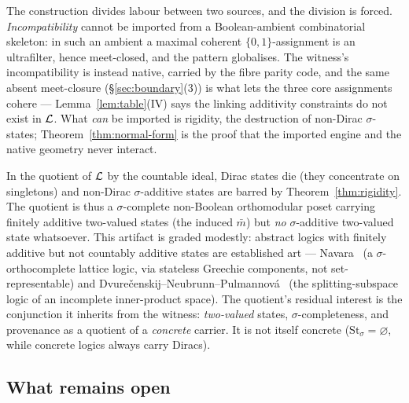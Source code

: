 \begin{remark}\label{rem:coherence-location}
The construction divides labour between two sources, and the division is forced.
\emph{Incompatibility} cannot be imported from a Boolean-ambient combinatorial
skeleton: in such an ambient a maximal coherent $\{0,1\}$-assignment is an
ultrafilter, hence meet-closed, and the pattern globalises. The witness's
incompatibility is instead native, carried by the fibre parity code, and the
same absent meet-closure (\S\ref{sec:boundary}(3)) is what lets the three core
assignments cohere --- Lemma~\ref{lem:table}(IV) says the linking additivity
constraints do not exist in $\mathcal{L}$. What \emph{can} be imported is rigidity, the
destruction of non-Dirac $\sigma$-states; Theorem~\ref{thm:normal-form} is the
proof that the imported engine and the native geometry never interact.
\end{remark}

\begin{remark}\label{rem:quotient}
In the quotient of $\mathcal{L}$ by the countable ideal, Dirac states die (they
concentrate on singletons) and non-Dirac $\sigma$-additive states are barred by
Theorem~\ref{thm:rigidity}. The quotient is thus a $\sigma$-complete non-Boolean
orthomodular poset carrying finitely additive two-valued states (the induced
$\bar m$) but \emph{no} $\sigma$-additive two-valued state whatsoever. This
artifact is graded modestly: abstract logics with finitely additive but not
countably additive states are established art ---
Navara~\cite{Navara1992} (a $\sigma$-orthocomplete lattice logic, via stateless
Greechie components, not set-representable) and
Dvure\v{c}enskij--Neubrunn--Pulmannov\'a~\cite{DvurecenskijNeubrunnPulmannova1992}
(the splitting-subspace logic of an incomplete inner-product space). The
quotient's residual interest is the conjunction it inherits from the witness:
\emph{two-valued} states, $\sigma$-completeness, and provenance as a quotient of
a \emph{concrete} carrier. It is not itself concrete
($\mathrm{St}_\sigma=\varnothing$, while concrete logics always carry Diracs).
\end{remark}

\subsection*{What remains open}

